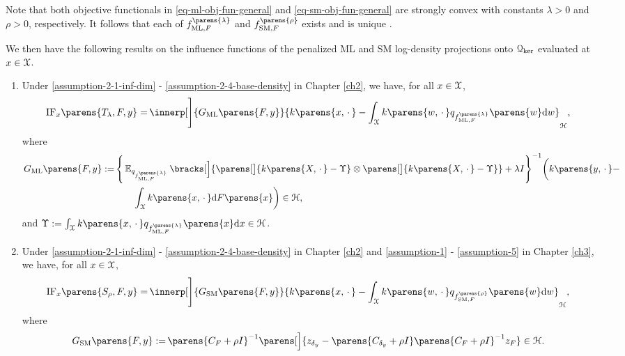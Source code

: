 Note that both objective functionals in \eqref{eq-ml-obj-fun-general} and \eqref{eq-sm-obj-fun-general} are strongly convex with constants $\lambda > 0$ and $\rho > 0$, respectively. It follows that each of $f_{\ML, F}^{\parens{\lambda}}$ and $f_{\SM, F}^{\parens{\rho}}$ exists and is unique  \parencite[Corollary 11.17 in][]{Bauschke2017-he}. 

We then have the following results on the influence functions of the penalized ML and SM log-density projections onto $\mathcal{Q}_{\ker}$ evaluated at $x \in \mathcal{X}$. 

\begin{theorem}\label{theorem-inf-fun-ml-sm-ker-exp-fam}
\leavevmode
	\begin{enumerate}[label=(\alph*)]
		\item \label{theorem-inf-fun-ml-sm-ker-exp-fam-a} Under \ref{assumption-2-1-inf-dim} - \ref{assumption-2-4-base-density} in Chapter \ref{ch2}, we have, for all $x \in \mathcal{X}$, 
		\begin{align}\label{eq-inf-fun-ml-ker-exp-fam}
			\mathrm{IF}_x \parens{T_{\lambda}, F, y} = & \, \innerp[\Bigg]{G_{\ML} \parens{F, y}}{ k \parens{x, \,\cdot\,} - \int_{\calX} k \parens{w, \,\cdot\,} q_{f_{\ML, F}^{\parens{\lambda}}} \parens{w} \diff w }_{\calH}, 
		\end{align}
		where
		\begin{align*}
			G_{\ML} \parens{F, y} := & \, \Bigg\{\E_{q_{f_{\ML, F}^{\parens{\lambda}}}} \bracks[\Big]{ \parens[\big]{k \parens{X, \,\cdot\,} - \Upsilon } \otimes \parens[\big]{k \parens{X, \,\cdot\,} - \Upsilon }} + \lambda I \Bigg\}^{-1} \bigg( k \parens{y, \,\cdot\,} -  \\ 
			& \qquad \int_{\calX} k \parens{x, \,\cdot\,} \diff F \parens{x} \bigg) \in \calH, 
		\end{align*}
		and $\Upsilon := \int_{\calX} k \parens{x, \,\cdot\,} q_{f_{\ML, F}^{\parens{\lambda}}}\parens{x} \diff x \in \calH$. 
		
		\item \label{theorem-inf-fun-ml-sm-ker-exp-fam-b} Under \ref{assumption-2-1-inf-dim} - \ref{assumption-2-4-base-density} in Chapter \ref{ch2} and \ref{assumption-1} - \ref{assumption-5} in Chapter \ref{ch3}, we have, for all $x \in \mathcal{X}$, 
		\begin{align}
			\mathrm{IF}_x \parens{S_{\rho}, F, y} = & \, \innerp[\Bigg]{G_{\SM} \parens{F, y}}{k \parens{x, \,\cdot\,} - \int_{\calX} k \parens{w, \,\cdot\,} q_{f_{\SM, F}^{\parens{\rho}}} \parens{w} \diff w}_{\calH}, 
		\end{align}
		where 
		\begin{align*}
			G_{\SM} \parens{F, y} := & \, \parens{C_{F} + \rho I}^{-1} \parens[\Big]{z_{\delta_y} - \parens{C_{\delta_y} + \rho I} \parens{C_{F} + \rho I}^{-1} z_{F}} \in \calH. 
		\end{align*}
	\end{enumerate}
\end{theorem}

